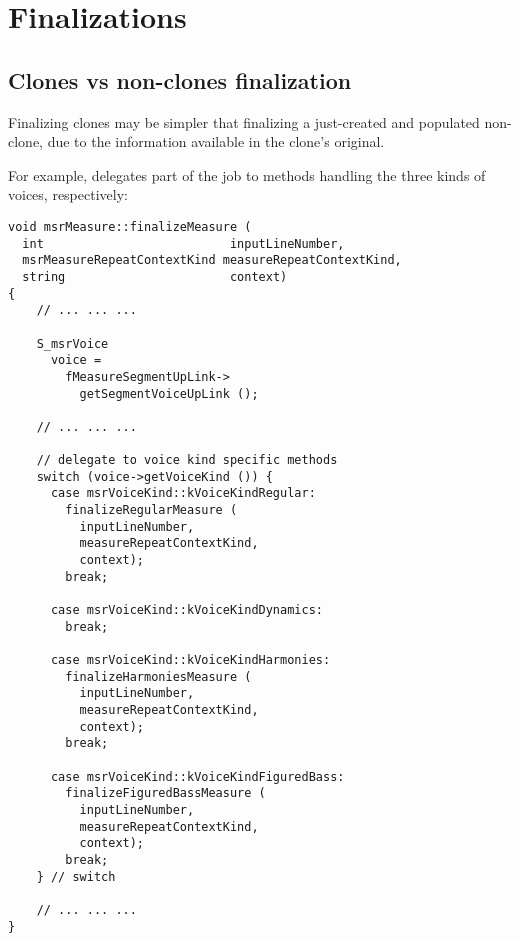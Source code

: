 
\chapter{Finalizations}

\section{Clones vs non-clones finalization}

Finalizing clones may be simpler that finalizing a just-created and populated non-clone, due to the information available in the clone's original.

For example,  delegates part of the job to methods handling the three kinds of voices, respectively:
\begin{lstlisting}[language=CPlusPlus]
void msrMeasure::finalizeMeasure (
  int                          inputLineNumber,
  msrMeasureRepeatContextKind measureRepeatContextKind,
  string                       context)
{
	// ... ... ...

    S_msrVoice
      voice =
        fMeasureSegmentUpLink->
          getSegmentVoiceUpLink ();

	// ... ... ...

    // delegate to voice kind specific methods
    switch (voice->getVoiceKind ()) {
      case msrVoiceKind::kVoiceKindRegular:
        finalizeRegularMeasure (
          inputLineNumber,
          measureRepeatContextKind,
          context);
        break;

      case msrVoiceKind::kVoiceKindDynamics:
        break;

      case msrVoiceKind::kVoiceKindHarmonies:
        finalizeHarmoniesMeasure (
          inputLineNumber,
          measureRepeatContextKind,
          context);
        break;

      case msrVoiceKind::kVoiceKindFiguredBass:
        finalizeFiguredBassMeasure (
          inputLineNumber,
          measureRepeatContextKind,
          context);
        break;
    } // switch

	// ... ... ...
}
\end{lstlisting}

